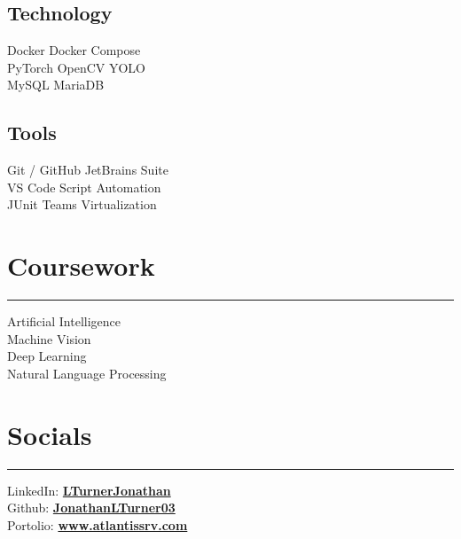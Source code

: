 \documentclass[]{styling}
\begin{document}
{\begin{minipage}[t]{0.33\textwidth}
        \sectionsep

        \subsection{Technology}
        Docker \textbullet{} Docker Compose \\
        PyTorch \textbullet{} OpenCV \textbullet{} YOLO \\
        MySQL \textbullet{} MariaDB \\
         
        \sectionsep
        \vspace{1 em}
        
        \subsection{Tools}
        Git / GitHub \textbullet{} JetBrains Suite \\
        VS Code \textbullet{} Script Automation \\
        JUnit  \textbullet{} Teams \textbullet{} Virtualization \\
        \sectionsep
        
        
        \section*{Coursework}
        \hrule
        \vspace{1 em}
        Artificial Intelligence \\
        Machine Vision \\
        Deep Learning \\
        Natural Language Processing \\
        \sectionsep
        
    
        
        
        \section*{Socials}
        \hrule
        \vspace{1 em}
        \begin{tabbing}
            LinkedIn: \space \space \= \href{https://www.linkedin.com/in/lturnerjonathan}{\bf LTurnerJonathan} \\
            Github: \> \href{https://github.com/JonathanLTurner03}{\bf JonathanLTurner03} \\
            Portolio: \> \href{https://www.atlantissrv.com}{\bf www.atlantissrv.com} \\
        \end{tabbing}
        \sectionsep
    \end{minipage}
}
%
%
\end{document}
